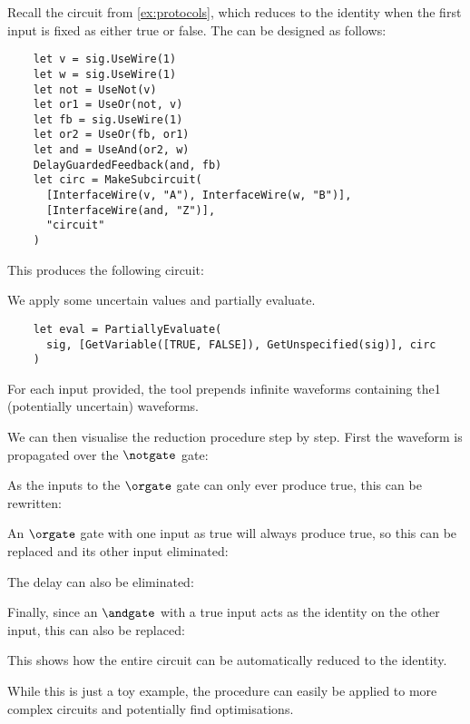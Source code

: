 \begin{example}
  Recall the circuit from \cref{ex:protocols}, which reduces to the identity
  when the first input is fixed as either true or false.
  The can be designed as follows:
  \begin{lstlisting}
    let v = sig.UseWire(1)
    let w = sig.UseWire(1)
    let not = UseNot(v)
    let or1 = UseOr(not, v)
    let fb = sig.UseWire(1)
    let or2 = UseOr(fb, or1)
    let and = UseAnd(or2, w)
    DelayGuardedFeedback(and, fb)
    let circ = MakeSubcircuit(
      [InterfaceWire(v, "A"), InterfaceWire(w, "B")],
      [InterfaceWire(and, "Z")],
      "circuit"
    )
  \end{lstlisting}
  This produces the following circuit:
  \begin{center}
    
  \end{center}
  We apply some uncertain values and partially evaluate.
  \begin{lstlisting}
    let eval = PartiallyEvaluate(
      sig, [GetVariable([TRUE, FALSE]), GetUnspecified(sig)], circ
    )
  \end{lstlisting}
  For each input provided, the tool prepends infinite waveforms containing the1
  (potentially uncertain) waveforms.
  \begin{center}
    
  \end{center}
  We can then visualise the reduction procedure step by step. First the
  waveform is propagated over the \(\notgate\) gate:
  \begin{center}
    
  \end{center}
  As the inputs to the \(\orgate\) gate can only ever produce true, this can be
  rewritten:
  \begin{center}
    
  \end{center}
  An \(\orgate\) gate with one input as true will always produce true, so this
  can be replaced and its other input eliminated:
  \begin{center}
    
  \end{center}
  The delay can also be eliminated:
  \begin{center}
    
  \end{center}
  Finally, since an \(\andgate\) with a true input acts as the identity on the
  other input, this can also be replaced:
  \begin{center}
    
  \end{center}
  This shows how the entire circuit can be automatically reduced to the
  identity.
\end{example}

While this is just a toy example, the procedure can easily be applied to more
complex circuits and potentially find optimisations.